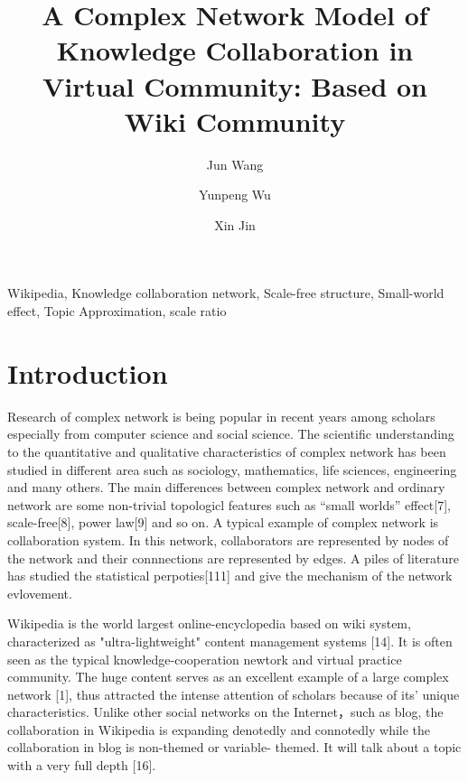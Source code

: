 \documentclass{elsarticle}
\begin{document}
\begin{frontmatter}
\title{A Complex Network Model of Knowledge Collaboration in Virtual Community: Based on Wiki Community
}
\author[buaa]{Jun Wang}

\author[buaa]{Yunpeng Wu}

\author[buaa]{Xin Jin}

\address[buaa]{School of Economics and Management, Beihang University, 
Beijing 100083, P.R. China}

\begin{abstract}
  
\end{abstract}

\begin{keyword}
Wikipedia, Knowledge collaboration network, Scale-free structure,
Small-world effect, Topic Approximation, scale ratio
  
\end{keyword}
\end{frontmatter}

\section{Introduction}
\label{sec:introduction}

Research of complex network is being popular in recent years among scholars
especially from computer science and social science.
 The scientific understanding to the quantitative and
qualitative characteristics of complex network has been studied in
different area such as sociology, mathematics, life sciences,
engineering and many others. The main differences between complex
network and ordinary network are  some non-trivial
topologicl features such as “small worlds” effect[7], scale-free[8],
power law[9] and so on. A typical example of complex network is collaboration system. In this network, collaborators are represented by nodes of the network
and their connnections are represented by edges. A piles of literature
has studied the statistical perpoties[111] and give the mechanism of
the network evlovement.



Wikipedia is the world largest online-encyclopedia based on wiki
system,  characterized as "ultra-lightweight" content management systems
[14]. It is often seen as the typical knowledge-cooperation newtork and virtual
practice community. The huge content serves as an excellent example of
a large complex network [1], thus attracted the intense attention of scholars
because of its' unique characteristics. Unlike other social networks on the
Internet，such as blog,  the
collaboration in Wikipedia is expanding denotedly and connotedly while the collaboration in blog is non-themed or variable- themed. It will talk about a topic with a very full depth [16].
\end{document}
